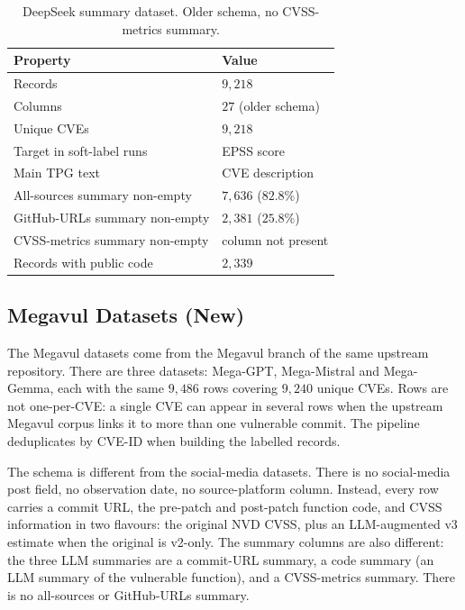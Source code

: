 \documentclass[11pt]{article}
\begin{document}
\begin{table}[h]
\centering
\small
\begin{tabular}{ll}
\toprule
Property & Value \\
\midrule
Records & $9{,}218$ \\
Columns & $27$ (older schema) \\
Unique CVEs & $9{,}218$ \\
Target in soft-label runs & EPSS score \\
Main TPG text & CVE description \\
All-sources summary non-empty & $7{,}636$ ($82.8\%$) \\
GitHub-URLs summary non-empty & $2{,}381$ ($25.8\%$) \\
CVSS-metrics summary non-empty & column not present \\
Records with public code & $2{,}339$ \\
\bottomrule
\end{tabular}
\caption{DeepSeek summary dataset. Older schema, no CVSS-metrics
summary.}
\end{table}

\subsection{Megavul Datasets (New)}
\label{sec:megavul}

The Megavul datasets come from the Megavul branch of the same upstream
repository. There are three datasets: Mega-GPT, Mega-Mistral and
Mega-Gemma, each with the same $9{,}486$ rows covering $9{,}240$
unique CVEs. Rows are not one-per-CVE: a single CVE can appear in
several rows when the upstream Megavul corpus links it to more than
one vulnerable commit. The pipeline deduplicates by CVE-ID when
building the labelled records.

The schema is different from the social-media datasets. There is no
social-media post field, no observation date, no source-platform
column. Instead, every row carries a commit URL, the pre-patch and
post-patch function code, and CVSS information in two flavours: the
original NVD CVSS, plus an LLM-augmented v3 estimate when the original
is v2-only. The summary columns are also different: the three LLM
summaries are a commit-URL summary, a code summary (an LLM summary of
the vulnerable function), and a CVSS-metrics summary. There is no
all-sources or GitHub-URLs summary.
\end{document}
